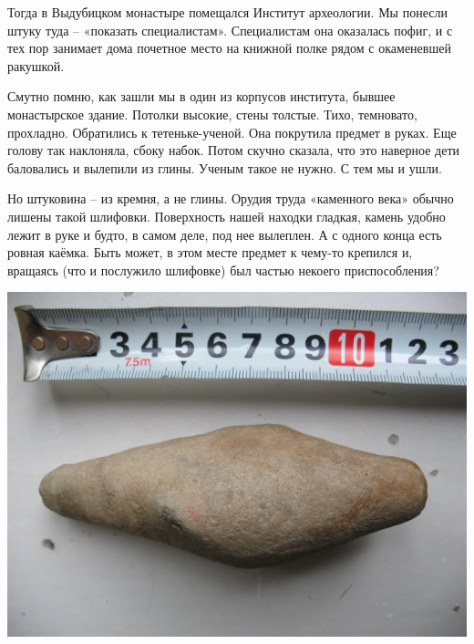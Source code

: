 Тогда в Выдубицком монастыре помещался Институт археологии. Мы понесли штуку туда – «показать специалистам». Специалистам она оказалась пофиг, и с тех пор занимает дома почетное место на книжной полке рядом с окаменевшей ракушкой.

Смутно помню, как зашли мы в один из корпусов института, бывшее монастырское здание. Потолки высокие, стены толстые. Тихо, темновато, прохладно. Обратились к тетеньке-ученой. Она покрутила предмет в руках. Еще голову так наклоняла, сбоку набок. Потом скучно сказала, что это наверное дети баловались и вылепили из глины. Ученым такое не нужно. С тем мы и ушли.


Но штуковина – из кремня, а не глины. Орудия труда «каменного века» обычно лишены такой шлифовки. Поверхность нашей находки гладкая, камень удобно лежит в руке и будто, в самом деле, под нее вылеплен. А с одного конца есть ровная каёмка. Быть может, в этом месте предмет к чему-то крепился и, вращаясь (что и послужило шлифовке) был частью некоего приспособления?


\newpage
\vspace*{\fill}
\begin{center}
\includegraphics[width=\linewidth]{chast-colebanie-osnov/nachalo/s_figovina-01.jpg}
\end{center}


